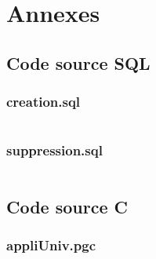 \documentclass[12pt,titlepage,a4paper]{report}
\begin{document}
	\chapter{Annexes}
		\section{Code source SQL}
			\subsection{creation.sql}
			\inputminted[tabsize=4,linenos,fontsize=\small]{sql}{../src/SQL/creation.sql}

			\subsection{suppression.sql}		
			\inputminted[tabsize=4,linenos,fontsize=\small]{sql}{../src/SQL/suppression.sql}

		\section{Code source C}
			\subsection{appliUniv.pgc}
			\inputminted[tabsize=4,linenos,fontsize=\small]{sql}{../src/C/appliUniv.pgc}
\end{document}
